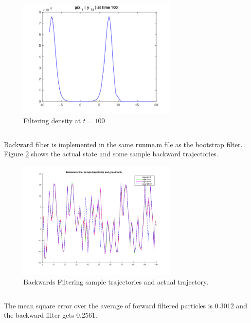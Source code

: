 \documentclass[11pt]{article}
\begin{document}
\begin{figure}[h]
  
  \centering
    \includegraphics[width=80mm]{../figs/017_15_t100N1000.pdf}
    \caption{Filtering density at $t=100$}
    \label{n10004}
\end{figure}

\subsection{}

Backward filter is implemented in the same runme.m file as the bootstrap filter. Figure \ref{bk} shows the actual state and some sample backward trajectories.

\begin{figure}[h]
  
  \centering
    \includegraphics[width=80mm]{../figs/018_16bksam.pdf}
    \caption{Backwards Filtering sample trajectories and actual trajectory.}
    \label{bk}
\end{figure}

\subsection{}

The mean square error over the average of forward filtered particles is 0.3012 and the backward filter gets 0.2561.
\end{document}
